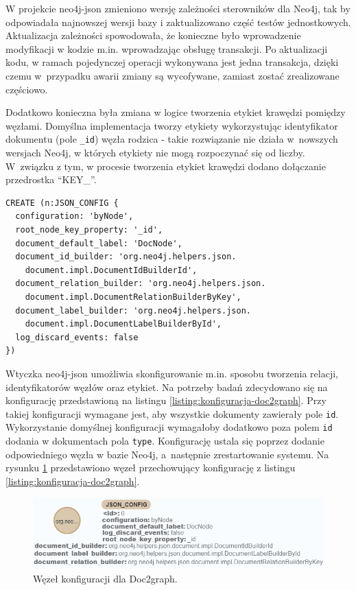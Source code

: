 \documentclass[a4paper,twoside,12pt]{book}
\begin{document}
W projekcie neo4j-json zmieniono wersję zależności sterowników dla Neo4j, tak by odpowiadała najnowszej wersji bazy i zaktualizowano część testów jednostkowych. Aktualizacja zależności spowodowała, że konieczne było wprowadzenie modyfikacji w kodzie m.in. wprowadzając obsługę transakcji. Po aktualizacji kodu, w ramach pojedynczej operacji wykonywana jest jedna transakcja, dzięki czemu w~przypadku awarii zmiany są wycofywane, zamiast zostać zrealizowane częściowo. 

Dodatkowo konieczna była zmiana w logice tworzenia etykiet krawędzi pomiędzy węzłami. Domyślna implementacja tworzy etykiety wykorzystując identyfikator dokumentu (pole \texttt{\_id}) węzła rodzica - takie rozwiązanie nie działa w~nowszych wersjach Neo4j, w których etykiety nie mogą rozpoczynać się od liczby. W~związku z tym, w procesie tworzenia etykiet krawędzi dodano dołączanie przedrostka ``KEY\_''.

\begin{lstlisting}[style=Cypher, caption={Konfiguracja Doc2graph.}, label={listing:konfiguracja-doc2graph}, captionpos=b]
CREATE (n:JSON_CONFIG {
  configuration: 'byNode',
  root_node_key_property: '_id',
  document_default_label: 'DocNode',
  document_id_builder: 'org.neo4j.helpers.json.
    document.impl.DocumentIdBuilderId',
  document_relation_builder: 'org.neo4j.helpers.json.
    document.impl.DocumentRelationBuilderByKey',
  document_label_builder: 'org.neo4j.helpers.json.
    document.impl.DocumentLabelBuilderById',
  log_discard_events: false
})
\end{lstlisting}

Wtyczka neo4j-json umożliwia skonfigurowanie m.in. sposobu tworzenia relacji, identyfikatorów węzłów oraz etykiet. Na potrzeby badań zdecydowano się na konfigurację przedstawioną na listingu \ref{listing:konfiguracja-doc2graph}. Przy takiej konfiguracji wymagane jest, aby wszystkie dokumenty zawierały pole \texttt{id}. Wykorzystanie domyślnej konfiguracji wymagałoby dodatkowo poza polem \texttt{id} dodania w dokumentach pola \texttt{type}. Konfigurację ustala się poprzez dodanie odpowiedniego węzła w bazie Neo4j, a~następnie zrestartowanie systemu. Na rysunku \ref{fig:węzeł-konfiguracji} przedstawiono węzeł przechowujący konfigurację z listingu \ref{listing:konfiguracja-doc2graph}.

\begin{figure}
\centering
\includegraphics[width=12cm]{images/węzeł konfiguracji doc2graph.png}
\caption{Węzeł konfiguracji dla Doc2graph.}
\label{fig:węzeł-konfiguracji}
\end{figure}
\end{document}
